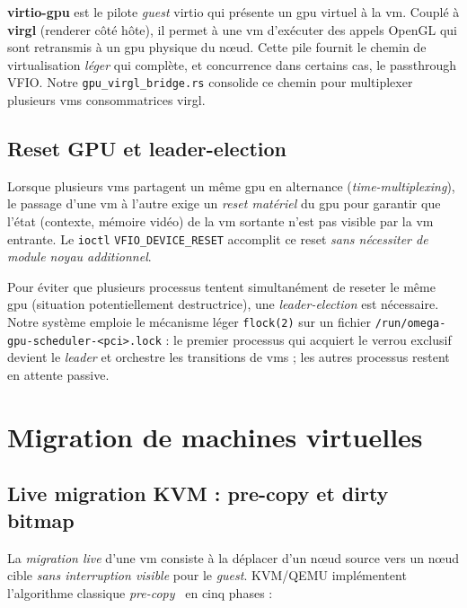 \textbf{virtio-gpu} est le pilote \emph{guest} virtio qui présente un \acrshort{gpu} virtuel à la \acrshort{vm}. Couplé à \textbf{virgl} (renderer côté hôte), il permet à une \acrshort{vm} d'exécuter des appels OpenGL qui sont retransmis à un \acrshort{gpu} physique du nœud. Cette pile fournit le chemin de virtualisation \emph{léger} qui complète, et concurrence dans certains cas, le passthrough VFIO. Notre \texttt{gpu\_virgl\_bridge.rs} consolide ce chemin pour multiplexer plusieurs \acrshort{vm}s consommatrices virgl.

\subsection{Reset GPU et leader-election}

Lorsque plusieurs \acrshort{vm}s partagent un même \acrshort{gpu} en alternance (\emph{time-multiplexing}), le passage d'une \acrshort{vm} à l'autre exige un \emph{reset matériel} du \acrshort{gpu} pour garantir que l'état (contexte, mémoire vidéo) de la \acrshort{vm} sortante n'est pas visible par la \acrshort{vm} entrante. Le \texttt{ioctl} \texttt{VFIO\_DEVICE\_RESET} accomplit ce reset \emph{sans nécessiter de module noyau additionnel}.

Pour éviter que plusieurs processus tentent simultanément de reseter le même \acrshort{gpu} (situation potentiellement destructrice), une \emph{leader-election} est nécessaire. Notre système emploie le mécanisme léger \texttt{flock(2)} sur un fichier \texttt{/run/omega-gpu-scheduler-<pci>.lock} : le premier processus qui acquiert le verrou exclusif devient le \emph{leader} et orchestre les transitions de \acrshort{vm}s ; les autres processus restent en attente passive.

\section{Migration de machines virtuelles}
\label{sec:migration-vm}

\subsection{Live migration KVM : pre-copy et dirty bitmap}

La \emph{migration live} d'une \acrshort{vm} consiste à la déplacer d'un nœud source vers un nœud cible \emph{sans interruption visible} pour le \emph{guest}. KVM/QEMU implémentent l'algorithme classique \emph{pre-copy}~\cite{clark_2005} en cinq phases :

